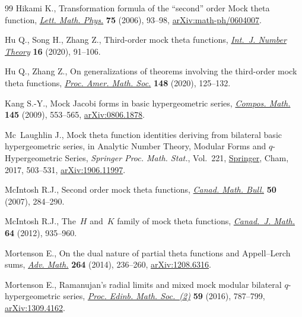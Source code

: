 \begin{thebibliography}{99}
Hikami K., Transformation formula of the ``second'' order {M}ock theta
  function, \href{https://doi.org/10.1007/s11005-005-0039-1}{\textit{Lett.
  Math. Phys.}} \textbf{75} (2006), 93--98,
  \href{http://arxiv.org/abs/math-ph/0604007}{arXiv:math-ph/0604007}.

Hu Q., Song H., Zhang Z., Third-order mock theta functions,
  \href{https://doi.org/10.1142/S1793042120500050}{\textit{Int.~J. Number
  Theory}} \textbf{16} (2020), 91--106.

Hu Q., Zhang Z., On generalizations of theorems involving the third-order mock
  theta functions, \href{https://doi.org/10.1090/proc/14691}{\textit{Proc.
  Amer. Math. Soc.}} \textbf{148} (2020), 125--132.

Kang S.-Y., Mock {J}acobi forms in basic hypergeometric series,
  \href{https://doi.org/10.1112/S0010437X09004060}{\textit{Compos. Math.}}
  \textbf{145} (2009), 553--565,
  \href{http://arxiv.org/abs/0806.1878}{arXiv:0806.1878}.

Mc~Laughlin J., Mock theta function identities deriving from bilateral basic
  hypergeometric series, in Analytic {N}umber {T}heory, {M}odular {F}orms and
  {$q$}-{H}ypergeometric {S}eries, \textit{Springer Proc. Math. Stat.}, Vol.~221, \href{https://doi.org/10.1007/978-3-319-68376-8_29}{Springer}, Cham,
  2017, 503--531, \href{http://arxiv.org/abs/1906.11997}{arXiv:1906.11997}.

McIntosh R.J., Second order mock theta functions,
  \href{https://doi.org/10.4153/CMB-2007-028-9}{\textit{Canad. Math. Bull.}}
  \textbf{50} (2007), 284--290.

McIntosh R.J., The~{$H$} and~{$K$} family of mock theta functions,
  \href{https://doi.org/10.4153/CJM-2011-066-0}{\textit{Canad.~J. Math.}}
  \textbf{64} (2012), 935--960.

Mortenson E., On the dual nature of partial theta functions and
  {A}ppell--{L}erch sums,
  \href{https://doi.org/10.1016/j.aim.2014.07.018}{\textit{Adv. Math.}}
  \textbf{264} (2014), 236--260,
  \href{http://arxiv.org/abs/1208.6316}{arXiv:1208.6316}.

Mortenson E., Ramanujan's radial limits and mixed mock modular bilateral
  {$q$}-hypergeometric series,
  \href{https://doi.org/10.1017/S0013091515000425}{\textit{Proc. Edinb. Math.
  Soc.~(2)}} \textbf{59} (2016), 787--799,
  \href{http://arxiv.org/abs/1309.4162}{arXiv:1309.4162}.


\end{thebibliography}
